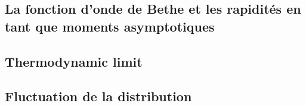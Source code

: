 \subsection{La fonction d'onde de Bethe et les rapidités en tant que moments asymptotiques}


\subsection{Thermodynamic limit}


%

%

\subsection{Fluctuation de la distribution}



